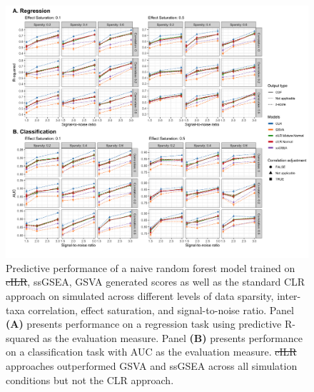\documentclass[10pt,letterpaper]{article}
\providecommand{\DIFaddtex}[1]{{\protect\color{blue}\uwave{#1}}} %
\providecommand{\DIFdeltex}[1]{{\protect\color{red}\sout{#1}}}                      %
\providecommand{\DIFaddFL}[1]{\DIFadd{#1}} %
\providecommand{\DIFdelFL}[1]{\DIFdel{#1}} %
\providecommand{\DIFaddbeginFL}{} %
\providecommand{\DIFaddendFL}{} %
\providecommand{\DIFdelbeginFL}{} %
\providecommand{\DIFdelendFL}{} %
\providecommand{\DIFadd}[1]{\texorpdfstring{\DIFaddtex{#1}}{#1}} %
\providecommand{\DIFdel}[1]{\texorpdfstring{\DIFdeltex{#1}}{}} %
\newcommand{\DIFscaledelfig}{0.5}
\newlength{\DIFdelgraphicswidth} %
\newlength{\DIFdelgraphicsheight} %
\newcommand{\DIFaddincludegraphics}[2][]{{\color{blue}\fbox{\DIFOincludegraphics[#1]{#2}}}} %
\newcommand{\DIFdelincludegraphics}[2][]{%
\sbox{\DIFdelgraphicsbox}{\DIFOincludegraphics[#1]{#2}}%
\settoboxwidth{\DIFdelgraphicswidth}{\DIFdelgraphicsbox} %
\settoboxtotalheight{\DIFdelgraphicsheight}{\DIFdelgraphicsbox} %
\scalebox{\DIFscaledelfig}{%
\parbox[b]{\DIFdelgraphicswidth}{\usebox{\DIFdelgraphicsbox}\\[-\baselineskip] \rule{\DIFdelgraphicswidth}{0em}}\llap{\resizebox{\DIFdelgraphicswidth}{\DIFdelgraphicsheight}{%
\setlength{\unitlength}{\DIFdelgraphicswidth}%
\begin{picture}(1,1)%
\thicklines\linethickness{2pt} %
{\color[rgb]{1,0,0}\put(0,0){\framebox(1,1){}}}%
{\color[rgb]{1,0,0}\put(0,0){\line( 1,1){1}}}%
{\color[rgb]{1,0,0}\put(0,1){\line(1,-1){1}}}%
\end{picture}%
}\hspace*{3pt}}} %
} %
\DeclareRobustCommand{\DIFaddbeginFL}{\DIFOaddbeginFL \let\includegraphics\DIFaddincludegraphics} %
\DeclareRobustCommand{\DIFaddendFL}{\DIFOaddendFL \let\includegraphics\DIFOincludegraphics} %
\DeclareRobustCommand{\DIFdelbeginFL}{\DIFOdelbeginFL \let\includegraphics\DIFdelincludegraphics} %
\DeclareRobustCommand{\DIFdelendFL}{\DIFOaddendFL \let\includegraphics\DIFOincludegraphics} %
\begin{document}
\begin{figure}[!h]
    \centering
    \includegraphics[width = \linewidth]{figures/sim_pred_combined.png}
    \caption{Predictive performance of a naive random forest model trained on \DIFdelbeginFL \DIFdelFL{cILR}\DIFdelendFL \DIFaddbeginFL \DIFaddFL{CBEA}\DIFaddendFL , ssGSEA, GSVA generated scores as well as the standard CLR approach on simulated across different levels of data sparsity, inter-taxa correlation, effect saturation, and signal-to-noise ratio. Panel \textbf{(A)} presents performance on a regression task using predictive R-squared as the evaluation measure. Panel \textbf{(B)} presents performance on a classification task with AUC as the evaluation measure. \DIFdelbeginFL \DIFdelFL{cILR }\DIFdelendFL \DIFaddbeginFL \DIFaddFL{CBEA }\DIFaddendFL approaches outperformed GSVA and ssGSEA across all simulation conditions but not the CLR approach.}
    \label{fig:6}
\end{figure}


\end{document}
